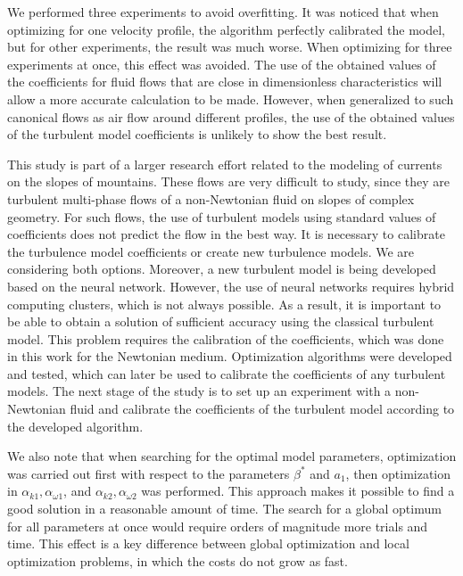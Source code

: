 \documentclass[mathematics,article,accept,pdftex,moreauthors]{Definitions/mdpi}
\begin{document}
We performed three experiments to avoid overfitting. It was noticed that when optimizing for one velocity profile, the algorithm perfectly calibrated the model, but for other experiments, the result was much worse. When optimizing for three experiments at once, this effect was avoided. The use of the obtained values of the coefficients for fluid flows that are close in dimensionless characteristics will allow a more accurate calculation to be made. However, when generalized to such canonical flows as air flow around different profiles, the use of the obtained values of the turbulent model coefficients is unlikely to show the best result.

\newpage

This study is part of a larger research effort related to the modeling of currents on the slopes of mountains. These flows are very difficult to study, since they are turbulent multi-phase flows of a non-Newtonian fluid on slopes of complex geometry. For such flows, the use of turbulent models using standard values of coefficients does not predict the flow in the best way. It is necessary to calibrate the turbulence model coefficients or create new turbulence models. We are considering both options. Moreover, a new turbulent model is being developed based on the neural network. However, the use of neural networks requires hybrid computing clusters, which is not always possible. As a result, it is important to be able to obtain a solution of sufficient accuracy using the classical turbulent model. This problem requires the calibration of the coefficients, which was done in this work for the Newtonian medium. Optimization algorithms were developed and tested, which can later be used to calibrate the coefficients of any turbulent models. The next stage of the study is to set up an experiment with a non-Newtonian fluid and calibrate the coefficients of the turbulent model according to the developed algorithm.

We also note that when searching for the optimal model parameters, optimization was carried out first with respect to the parameters $\beta^*$ and $a_1$, then optimization in $\alpha_{k1}, \alpha_{\omega1}$, and $\alpha_{k2}, \alpha_{\omega2}$ was performed. This approach makes it possible to find a good solution in a reasonable amount of time.
The search for a global optimum for all parameters at once would require orders of magnitude more trials and time.
This effect is a key difference between global optimization and local optimization problems, in which the costs do not grow as fast.
\end{document}
